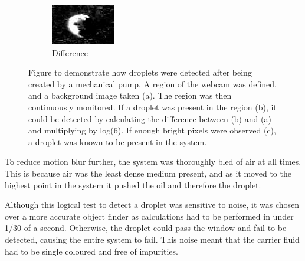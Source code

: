 \documentclass{physics_article_B}
\begin{document}
\begin{figure}[H]
\begin{subfigure}[b]{0.3\textwidth}
                            \includegraphics[width=\textwidth]{Figures/DropFinder/DropFinder3.eps}
                            \caption{Difference}
                            \label{fig:detector:diff}
                        \end{subfigure}
                        \caption{Figure to demonstrate how droplets were detected after being created by a mechanical pump. A region of the webcam was defined, and a background image taken (a). The region was then continuously monitored. If a droplet was present in the region (b), it could be detected by calculating the difference between (b) and (a) and multiplying by log(6). If enough bright pixels were observed (c), a droplet was known to be present in the system.}\label{fig:detector}
                    \end{figure}
            
            To reduce motion blur further, the system was thoroughly bled of air at all times. This is because air was the least dense medium present, and as it moved to the highest point in the system it pushed the oil and therefore the droplet. 
            
            Although this logical test to detect a droplet was sensitive to noise, it was chosen over a more accurate object finder as calculations had to be performed in under 1/30 of a second. Otherwise, the droplet could pass the window and fail to be detected, causing the entire system to fail. This noise meant that the carrier fluid had to be single coloured and free of impurities. 
            
\end{document}
